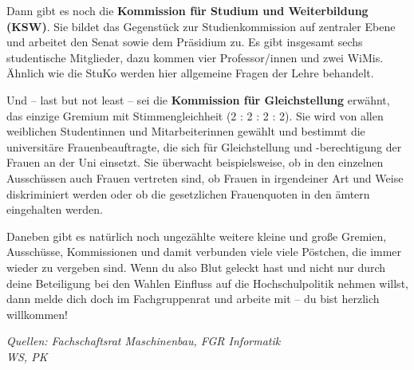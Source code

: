 Dann gibt es noch die \textbf{Kommission für Studium und Weiterbildung (KSW)}. 
Sie bildet das Gegenstück zur Studienkommission auf zentraler Ebene und arbeitet den Senat sowie dem 
Präsidium zu. Es gibt insgesamt sechs studentische Mitglieder, dazu kommen vier Professor/innen und zwei WiMis. 
Ähnlich wie die StuKo werden hier allgemeine Fragen der Lehre behandelt.

Und -- last but not least -- sei die \textbf{Kommission für Gleichstellung} 
erwähnt, das einzige Gremium mit Stimmengleichheit (2 : 2 : 2 : 2). Sie wird von allen 
weiblichen Studentinnen und Mitarbeiterinnen gewählt und bestimmt 
 die universitäre Frauenbeauftragte, die sich für Gleichstellung und 
-berechtigung der Frauen an der Uni einsetzt. Sie überwacht beispielsweise, ob 
in den einzelnen Ausschüssen auch Frauen vertreten sind, ob Frauen in 
irgendeiner Art und Weise diskriminiert werden oder ob die gesetzlichen 
Frauenquoten in den ämtern eingehalten werden. 

Daneben gibt es natürlich noch ungezählte weitere kleine und große Gremien,
Ausschüsse, Kommissionen und damit verbunden viele viele Pöstchen, die immer 
wieder zu vergeben sind. Wenn du also Blut geleckt hast und nicht nur durch
deine Beteiligung bei den Wahlen Einfluss auf die Hochschulpolitik nehmen willst,
dann melde dich doch im Fachgruppenrat und arbeite mit -- du bist herzlich
willkommen!

\emph{Quellen: Fachschaftsrat Maschinenbau, FGR Informatik\\WS, PK}
